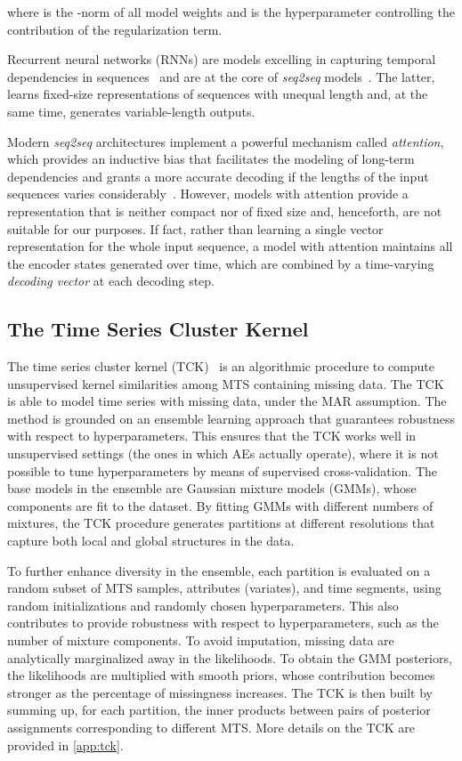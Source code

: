 \documentclass[a4paper,10pt,pdftex]{article}
\begin{document}
where  is the -norm of all model weights  and  is the hyperparameter controlling the contribution of the regularization term.


Recurrent neural networks (RNNs) are models excelling in capturing temporal dependencies in sequences~\cite{elman1990finding, bianchi2017recurrent} and are at the core of \textit{seq2seq} models~\cite{sutskever2014sequence}.
The latter, learns fixed-size representations of sequences with unequal length and, at the same time, generates variable-length outputs.

Modern \textit{seq2seq} architectures implement a powerful mechanism called \textit{attention}, which provides an inductive bias that facilitates the modeling of long-term dependencies and grants a more accurate decoding if the lengths of the input sequences varies considerably~\cite{BahdanauCB14, qin2017dual}.
However, models with attention provide a representation that is neither compact nor of fixed size and, henceforth, are not suitable for our purposes.
If fact, rather than learning a single vector representation for the whole input sequence, a model with attention maintains all the encoder states generated over time, which are combined by a time-varying \textit{decoding vector} at each decoding step.

\subsection{The Time Series Cluster Kernel}
\label{sec:tck}
The time series cluster kernel (TCK)~\cite{mikalsen2017time} is an algorithmic procedure to compute unsupervised kernel similarities among MTS containing missing data.
The TCK is able to model time series with missing data, under the MAR assumption.
The method is grounded on an ensemble learning approach that guarantees robustness with respect to hyperparameters.
This ensures that the TCK works well in unsupervised settings (the ones in which AEs actually operate), where it is not possible to tune hyperparameters by means of supervised cross-validation. 
The base models in the ensemble are Gaussian mixture models (GMMs), whose components are fit to the dataset.
By fitting GMMs with different numbers of mixtures, the TCK procedure generates partitions at different resolutions that capture both local and global structures in the data.

To further enhance diversity in the ensemble, each partition is evaluated on a random subset of MTS samples, attributes (variates), and time segments, using random initializations and randomly chosen hyperparameters. 
This also contributes to provide robustness with respect to hyperparameters, such as the number of mixture components.
To avoid imputation, missing data are analytically marginalized away in the likelihoods. 
To obtain the GMM posteriors, the likelihoods are multiplied with smooth priors, whose contribution becomes stronger as the percentage of missingness increases.
The TCK is then built by summing up, for each partition, the inner products between pairs of posterior assignments corresponding to different MTS.
More details on the TCK are provided in \ref{app:tck}.
\end{document}
